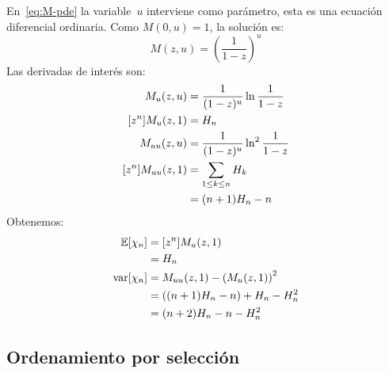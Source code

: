   En~\eqref{eq:M-pde} la variable~\(u\) interviene como parámetro,
  esta es una ecuación diferencial ordinaria.
  Como \(M(0, u) = 1\),
  la solución es:
  \begin{equation*}
    \label{eq:M-solution}
    M(z, u)
      = \left( \frac{1}{1 - z} \right)^u
  \end{equation*}
  Las derivadas de interés son:
  \begin{align*}
    M_u(z, u)
      &= \frac{1}{(1 - z)^u} \ln \frac{1}{1 - z} \\
    [z^n] M_u(z, 1)
      &= H_n \\
    M_{u u}(z, u)
      &= \frac{1}{(1 - z)^u} \ln^2 \frac{1}{1 - z} \\
    [z^n] M_{u u}(z, 1)
      &= \sum_{1 \le k \le n} H_k \notag \\
      &= (n + 1) H_n - n
  \end{align*}
  Obtenemos:
  \begin{align}
    \operatorname{\mathbb{E}}[ \chi_n ]
      &= [z^n] M_u (z, 1) \\
      &= H_n \\
    \operatorname{var}[ \chi_n ]
      &= M_{u u} (z, 1) - \left( M_u (z, 1) \right)^2 \notag \\
      &= ((n + 1) H_n - n) + H_n - H_n^2 \notag \\
      &= (n + 2) H_n - n - H_n^2
  \end{align}

\subsection{Ordenamiento por selección}
\label{sec:ordenamiento-seleccion}

